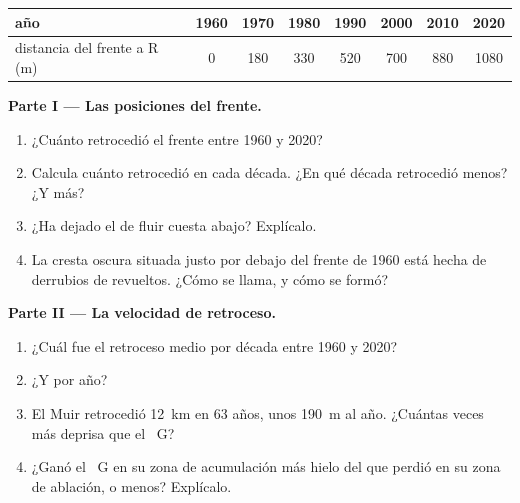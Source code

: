 \begin{problem}
\begin{center}
\smallskip
{\small
\begin{tabular}{|l|c|c|c|c|c|c|c|}
\hline
año & 1960 & 1970 & 1980 & 1990 & 2000 & 2010 & 2020 \\
\hline
distancia del frente a R (m) & 0 & 180 & 330 & 520 & 700 & 880 & 1080 \\
\hline
\end{tabular}}
\end{center}

\noindent\textbf{Parte I --- Las posiciones del frente.}\par\nopagebreak
\begin{enumerate}[beginpenalty=10000]
  \item ¿Cuánto retrocedió el frente entre 1960 y 2020?
  \item Calcula cuánto retrocedió en cada década. ¿En qué década retrocedió
        menos? ¿Y más?
  \item ¿Ha dejado el  de fluir cuesta abajo? Explícalo.
  \item La cresta oscura situada justo por debajo del frente de 1960 está
        hecha de derrubios de  revueltos. ¿Cómo se llama, y cómo se formó?
\end{enumerate}

\noindent\textbf{Parte II --- La velocidad de retroceso.}\par\nopagebreak
\begin{enumerate}[resume, beginpenalty=10000]
  \item ¿Cuál fue el retroceso medio por década entre 1960 y 2020?
  \item ¿Y por año?
  \item El  Muir retrocedió \qty{12}{km} en 63 años, unos
        \qty{190}{m} al año. ¿Cuántas veces más deprisa que el ~G?
  \item ¿Ganó el ~G en su zona de acumulación más hielo del que
        perdió en su zona de ablación, o menos? Explícalo.
\end{enumerate}


\end{problem}
